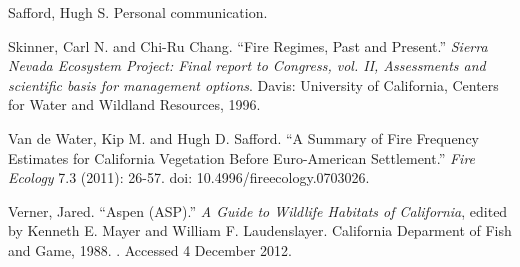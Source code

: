 \begin{hangparas}{.25in}{1}
Safford, Hugh S. Personal communication.

Skinner, Carl N. and Chi-Ru Chang. ``Fire Regimes, Past and Present.'' \emph{Sierra Nevada Ecosystem Project: Final report to Congress, vol. II, Assessments and scientific basis for management options}. Davis: University of California, Centers for Water and Wildland Resources, 1996.

Van de Water, Kip M. and Hugh D. Safford. ``A Summary of Fire Frequency Estimates for California Vegetation Before Euro-American Settlement.'' \emph{Fire Ecology} 7.3 (2011): 26-57. doi: 10.4996/fireecology.0703026.

Verner, Jared. ``Aspen (ASP).'' \emph{A Guide to Wildlife Habitats of California}, edited by Kenneth E. Mayer and William F. Laudenslayer. California Deparment of Fish and Game, 1988. . Accessed 4 December 2012.


\end{hangparas}

